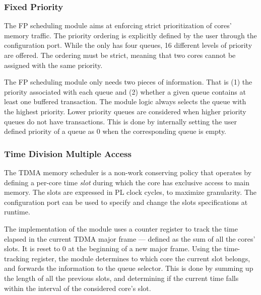 \subsubsection{Fixed Priority}
The FP scheduling module aims at enforcing strict prioritization of
cores' memory traffic. The priority ordering is explicitly defined by
the user through the configuration port. While the \schim only has
four queues, 16 different levels of priority are offered. The ordering
must be strict, meaning that two cores cannot be assigned with the
same priority.

The FP scheduling module only needs two pieces of information. That is
(1) the priority associated with each queue and (2) whether a given
queue contains at least one buffered transaction. The module logic
always selects the queue with the highest priority. Lower priority
queues are considered when higher priority queues do not have
transactions. This is done by internally setting the user defined
priority of a queue as 0 when the corresponding queue is empty.

\subsubsection{Time Division Multiple Access}
The TDMA memory scheduler is a non-work conserving policy that
operates by defining a per-core time \emph{slot} during which the core
has exclusive access to main memory.  The slots are expressed in PL
clock cycles, to maximize granularity. The configuration port can be
used to specify and change the slots specifications at runtime.

The implementation of the module uses a counter register to track the
time elapsed in the current TDMA major frame --- defined as the sum of
all the cores' slots. It is reset to 0 at the beginning of a new major
frame. Using the time-tracking register, the module determines to
which core the current slot belongs, and forwards the information to
the queue selector. This is done by summing up the length of all the
previous slots, and determining if the current time falls within the
interval of the considered core's slot.


